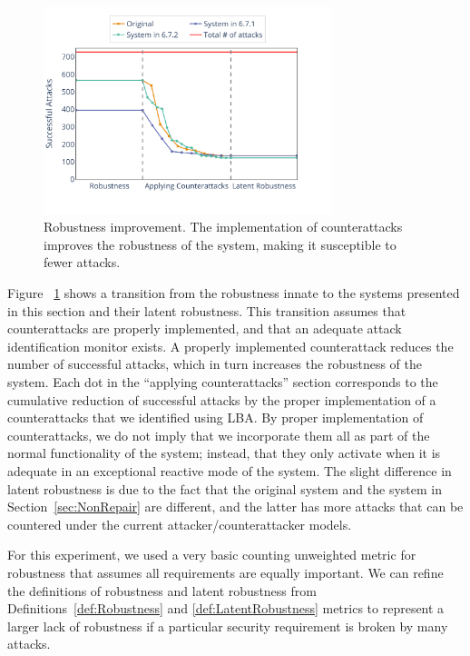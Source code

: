 {\begin{figure}[t]
  \includegraphics[width=0.75\textwidth]{Figures/Robustness.pdf} 
  
  \caption{Robustness improvement. The implementation of counterattacks improves the robustness of the system, making it susceptible to fewer attacks.}
  \label{fig:Robustness}
\end{figure}
Figure ~\ref{fig:Robustness} shows a transition from the robustness innate to the systems presented in this section and their latent robustness. This transition assumes that counterattacks are properly implemented, and that an adequate attack identification monitor exists. A properly implemented counterattack reduces the number of successful attacks, which in turn increases the robustness of the system. Each dot in the ``applying counterattacks'' section corresponds to the cumulative reduction of successful attacks by the proper implementation of a counterattacks that we identified using LBA. By proper implementation of counterattacks, we do not imply that we incorporate them all as part of the normal functionality of the system; instead, that they only activate when it is adequate in an exceptional reactive mode of the system. The slight difference in latent robustness is due to the fact that the original system and the system in Section~\ref{sec:NonRepair} are different, and the latter has more attacks that can be countered under the current attacker/counterattacker models. 

For this experiment, we used a very basic counting unweighted metric for robustness that assumes all requirements are equally important. We can refine the definitions of robustness and latent robustness from Definitions~\ref{def:Robustness} and \ref{def:LatentRobustness} metrics to represent a larger lack of robustness if a particular security requirement is broken by many attacks. 

}
